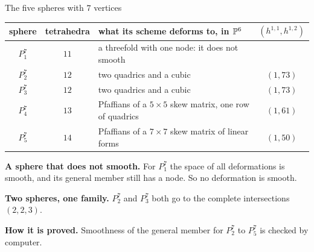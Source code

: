 \begin{frame}{The five spheres with \(7\) vertices}
{\centering\small
\renewcommand{\arraystretch}{1.15}\setlength{\tabcolsep}{5pt}
\begin{tabular}{cclc}
sphere & tetrahedra & what its scheme deforms to, in \(\mathbb P^6\) & \((h^{1,1},h^{1,2})\)\\ \hline
\(P^7_1\) & \(11\) & a threefold with one node: it does not smooth & \\
\(P^7_2\) & \(12\) & two quadrics and a cubic & \((1,73)\)\\
\(P^7_3\) & \(12\) & two quadrics and a cubic & \((1,73)\)\\
\(P^7_4\) & \(13\) & Pfaffians of a \(5\times5\) skew matrix, one row of quadrics & \((1,61)\)\\
\(P^7_5\) & \(14\) & Pfaffians of a \(7\times7\) skew matrix of linear forms & \((1,50)\)
\end{tabular}\par}\medskip
\textbf{A sphere that does not smooth.} For \(P^7_1\) the space of all deformations is smooth, and its general member still has a node. So no deformation is smooth.
\par\smallskip
\textbf{Two spheres, one family.} \(P^7_2\) and \(P^7_3\) both go to the complete intersections \((2,2,3)\).
\par\smallskip
\textbf{How it is proved.} Smoothness of the general member for \(P^7_2\) to \(P^7_5\) is checked by computer.
\end{frame}

